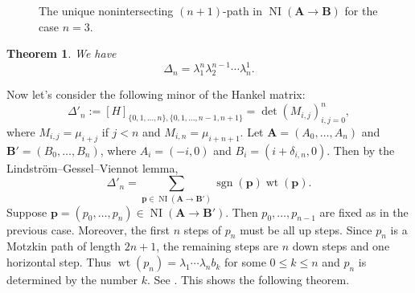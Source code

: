 \documentclass[oneside]{book}
\numberwithin{equation}{section}
\newtheorem{thm}{Theorem}[section]
\theoremstyle{definition}
\newcommand\NI{\operatorname{NI}}
\newcommand\sgn{\operatorname{sgn}}
\newcommand\wt{\operatorname{wt}}
\renewcommand\vec[1]{\bm{#1}}
\newcommand\dlabel[3]{\node at (#1+0.7,#2-0.3) {\( #3 \)};}
\begin{document}
\begin{figure}
  \centering
{}
\caption{The unique nonintersecting \( (n+1) \)-path in
  \( \NI(\vec A \to \vec B) \) for the case \( n=3 \).}
  \label{fig:14}
\end{figure}

\begin{thm}\label{thm:8}
  We have
  \[
    \Delta_n = \lambda_1^n \lambda_2^{n-1} \cdots \lambda_n^1.
  \]
\end{thm}


Now let's consider the following minor of the Hankel matrix:
\[
 \Delta'_n := [H]_{\{0,1,\dots,n\},\{0,1,\dots,n-1,n+1\}} = \det(M_{i,j})_{i,j=0}^n,
\]
where \( M_{i,j} = \mu_{i+j} \) if \( j<n \) and
\( M_{i,n} = \mu_{i+n+1} \). Let \( \vec A = (A_0,\dots,A_n) \) and
\( \vec B' = (B_0,\dots,B_n) \), where \( A_i = (-i,0) \) and
\( B_i = (i + \delta_{i,n},0) \). Then by the
Lindstr\"om--Gessel--Viennot lemma,
\[
  \Delta'_n = \sum_{\vec p \in \NI(\vec A \to \vec B')} \sgn(\vec p)
  \wt(\vec p).
\]
Suppose \( \vec p = (p_0,\dots,p_n)\in \NI(\vec A \to \vec B') \).
Then \( p_0,\dots,p_{n-1} \) are fixed as in the previous case.
Moreover, the first \( n \) steps of \( p_n \) must be all up steps.
Since \( p_n \) is a Motzkin path of length \( 2n+1 \), the remaining
steps are \( n \) down steps and one horizontal step. Thus
\( \wt(p_n) = \lambda_1 \cdots \lambda_n b_k \) for some
\( 0\le k\le n \) and \( p_n \) is determined by the number \( k \).
See . This shows the following theorem.
\end{document}

